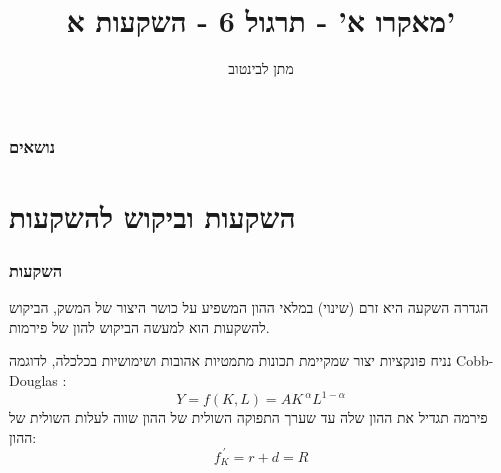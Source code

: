 \documentclass[usenames,dvipsnames, 10pt]{beamer}
\title[]{{מאקרו א' - תרגול 6 - השקעות א'}}
\author{\texthebrew{ מתן לבינטוב}}
\institute[{{ אב"ג}}]{{ אוניברסיטת בן גוריון בנגב}}
\date{}
\begin{document}
\begin{RTL}
\begin{frame}
\titlepage
\end{frame}
\begin{frame}
    \frametitle{נושאים}
    \tableofcontents
    

\end{frame}
\section{השקעות וביקוש להשקעות}
\begin{frame}
    \frametitle{השקעות}
    \begin{exampleblock}{הגדרה}
        השקעה היא זרם (שינוי) במלאי ההון המשפיע על כושר היצור של המשק, הביקוש להשקעות הוא למעשה הביקוש להון של פירמות.
    \end{exampleblock}
    נניח פונקציות יצור שמקיימת תכונות מתמטיות אהובות ושימושיות בכלכלה, לדוגמה Cobb-Douglas :
    \[Y = f\left(K,L\right) = AK^{\ \alpha} L^{1-\alpha}\]
    פירמה תגדיל את ההון שלה עד שערך התפוקה השולית של ההון שווה לעלות השולית של ההון:
    \[f^{\ \prime}_K = r + d = R \]
    

\end{frame}

\end{RTL}
\end{document}

